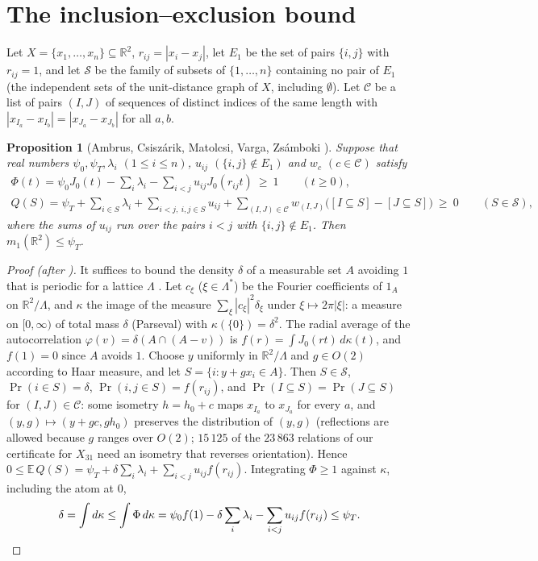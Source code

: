 \documentclass[11pt,a4paper]{amsart}
\newtheorem{proposition}[theorem]{Proposition}
\theoremstyle{remark}
\newcommand{\R}{\mathbb{R}}
\newcommand{\E}{\mathbb{E}}
\newcommand{\NPTS}{31}
\newcommand{\NCONG}{23\,863}
\begin{document}
\section{The inclusion--exclusion bound}\label{sec:ie}

Let $X=\{x_1,\dots,x_n\}\subseteq\R^2$, $r_{ij}=|x_i-x_j|$, let $E_1$ be the set of pairs $\{i,j\}$ with $r_{ij}=1$, and
let $\mathcal S$ be the family of subsets of $\{1,\dots,n\}$ containing no pair of $E_1$ (the independent sets of the
unit-distance graph of $X$, including $\emptyset$). Let $\mathcal C$ be a list of pairs $(I,J)$ of sequences of distinct
indices of the same length with $|x_{I_a}-x_{I_b}|=|x_{J_a}-x_{J_b}|$ for all $a,b$.

\begin{proposition}[Ambrus, Csisz\'arik, Matolcsi, Varga, Zs\'amboki \cite{ACMVZ}]\label{prop:ie}
Suppose that real numbers $\psi_0,\psi_T,\lambda_i$ $(1\le i\le n)$, $u_{ij}$ $(\{i,j\}\notin E_1)$ and $w_c$
$(c\in\mathcal C)$ satisfy
\begin{gather*}
\Phi(t)=\psi_0J_0(t)-\sum_i\lambda_i-\sum_{i<j}u_{ij}J_0(r_{ij}t)\ \ge\ 1\qquad(t\ge0),\\
Q(S)=\psi_T+\sum_{i\in S}\lambda_i+\sum_{i<j,\ i,j\in S}u_{ij}+\sum_{(I,J)\in\mathcal C}w_{(I,J)}\bigl([I\subseteq S]-[J\subseteq S]\bigr)
\ \ge\ 0\qquad(S\in\mathcal S),
\end{gather*}
where the sums of $u_{ij}$ run over the pairs $i<j$ with $\{i,j\}\notin E_1$. Then $m_1(\R^2)\le\psi_T$.
\end{proposition}

\begin{proof}[Proof (after \cite{ACMVZ})]
It suffices to bound the density $\delta$ of a measurable set $A$ avoiding $1$ that is periodic for a lattice
$\Lambda$ \cite[§2]{ACMVZ}. Let $c_\xi$ ($\xi\in\Lambda^*$) be the Fourier coefficients of $1_A$ on $\R^2/\Lambda$, and
$\kappa$ the image of the measure $\sum_\xi|c_\xi|^2\delta_\xi$ under $\xi\mapsto2\pi|\xi|$: a measure on $[0,\infty)$ of
total mass $\delta$ (Parseval) with $\kappa(\{0\})=\delta^2$. The radial average of the autocorrelation
$\varphi(v)=\delta(A\cap(A-v))$ is $f(r)=\int J_0(rt)\,d\kappa(t)$, and $f(1)=0$ since $A$ avoids $1$. Choose $y$
uniformly in $\R^2/\Lambda$ and $g\in O(2)$ according to Haar measure, and let $S=\{i:y+gx_i\in A\}$. Then
$S\in\mathcal S$, $\Pr(i\in S)=\delta$, $\Pr(i,j\in S)=f(r_{ij})$, and $\Pr(I\subseteq S)=\Pr(J\subseteq S)$ for
$(I,J)\in\mathcal C$: some isometry $h=h_0+c$ maps $x_{I_a}$ to $x_{J_a}$ for every $a$, and $(y,g)\mapsto(y+gc,gh_0)$
preserves the distribution of $(y,g)$ (reflections are allowed because $g$ ranges over $O(2)$; $15\,125$ of the $\NCONG$
relations of our certificate for $X_{\NPTS}$ need an isometry that reverses orientation). Hence
$0\le\E\,Q(S)=\psi_T+\delta\sum_i\lambda_i+\sum_{i<j}u_{ij}f(r_{ij})$. Integrating $\Phi\ge1$ against $\kappa$,
including the atom at $0$,
\[
\delta=\int d\kappa\le\int\Phi\,d\kappa=\psi_0f(1)-\delta\sum_i\lambda_i-\sum_{i<j}u_{ij}f(r_{ij})\le\psi_T.\qedhere
\]
\end{proof}
\end{document}
